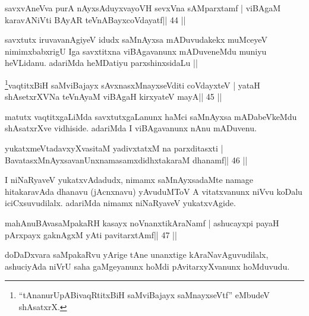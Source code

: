 
\begin{shl}
savxvAneVva purA nAyxsAduyxvayoVH sevxVna sAMparxtamf |
viBAgaM karavANiVti BAyAR teVnABayxcoVdayatf\hfill || 44 ||
\end{shl}

\begin{artha}
savxtutx iruvavanAgiyeV idudx saMnAyxsa mADuvudakekx muMceyeV
nimimxbabxrigU Iga savxtitxna viBAgavanunx mADuveneMdu muniyu
heVLidanu. adariMda heMDatiyu parxshinxsidaLu || 
\end{artha}


\begin{shl}
\footnote{``tAnanurUpABivaqRtitxBiH saMviBajayx saMnayxseVtf''
  eMbudeV shAsatxrX.}vaqtitxBiH saMviBajayx sAvxnasxMnayxseVditi coVdayxteV |
yataH shAsetxrXVNa teVnAyaM viBAgaH kirxyateV mayA\hfill || 45 ||
\end{shl}

\begin{artha}
matutx vaqtitxgaLiMda savxtutxgaLanunx haMci saMnAyxsa
mADabeVkeMdu shAsatxrXve vidhiside. adariMda I viBAgavanunx nAnu 
mADuvenu. 
\end{artha}


\begin{shl}
yukatxmeVtadavxyXvasitaM yadivxtatxM na parxditasxti |
BavatasxMnAyxsavanUnxnamasamxdidhxtakaraM dhanamf\hfill || 46 ||
\end{shl}

\begin{artha}
I niNaRyaveV yukatxvAdadudx, nimamx saMnAyxsadaMte namage hitakaravAda dhanavu (jAcnxnavu) yAvuduMToV A vitatxvanunx niVvu koDalu iciCxsuvudilalx. adariMda nimamx niNaRyaveV yukatxvAgide.
\end{artha}


\begin{shl}
mahAnuBAvasaMpakaRH kasayx noVnanxtikAraNamf |
ashucayxpi payaH pArxpayx gaknAgxM yAti pavitarxtAmf\hfill || 47 ||
\end{shl}

\begin{artha}
doDaDxvara saMpakaRvu yArige tAne unanxtige kAraNavAguvudilalx, ashuciyAda niVrU saha gaMgeyanunx hoMdi pAvitarxyXvanunx hoMduvudu.
\end{artha}

